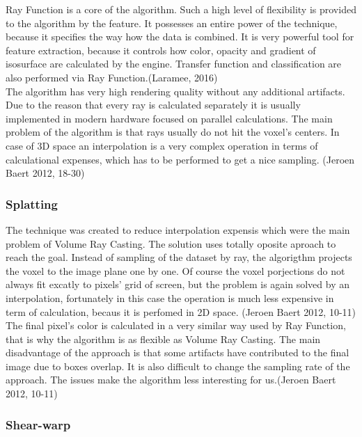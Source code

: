 \documentclass[twoside, english, 11pt]{report}
\begin{document}
Ray Function is a core of the algorithm. Such a high level of flexibility is provided to the algorithm by the feature. It possesses an entire power of the technique, because it specifies the way how the data is combined.  It is very powerful tool for feature extraction, because it controls how color, opacity and gradient of isosurface are calculated by the engine. Transfer function and classification are also performed via Ray Function.(Laramee, 2016)\\

The algorithm has very high rendering quality without any additional artifacts. Due to the reason that every ray is calculated separately it is usually implemented in modern hardware focused on parallel calculations. The main problem of the algorithm is that rays usually do not hit the voxel's centers. In case of 3D space an interpolation is a very complex operation in terms of calculational expenses, which has to be performed to get a nice sampling. (Jeroen Baert 2012, 18-30)

\subsubsection{Splatting}

The technique was created to reduce interpolation expensis which were the main problem of Volume Ray Casting. The solution uses totally oposite aproach to reach the goal. Instead of sampling of the dataset by ray, the algorigthm projects the voxel to the image plane one by one. Of course the voxel porjections do not always fit excatly to pixels' grid of screen, but the problem is again solved by an interpolation, fortunately in this case the operation is much less expensive in term of calculation, becaus it is perfomed in 2D space. (Jeroen Baert 2012, 10-11)\\

The final pixel's color is calculated in a very similar way used by Ray Function, that is why the algorithm is as flexible as Volume Ray Casting. The main disadvantage of the approach is that some artifacts have contributed to the final image due to boxes overlap. It is also difficult to change the sampling rate of the approach. The issues make the algorithm less interesting for us.(Jeroen Baert 2012, 10-11)\\

\subsubsection{Shear-warp}
\end{document}
